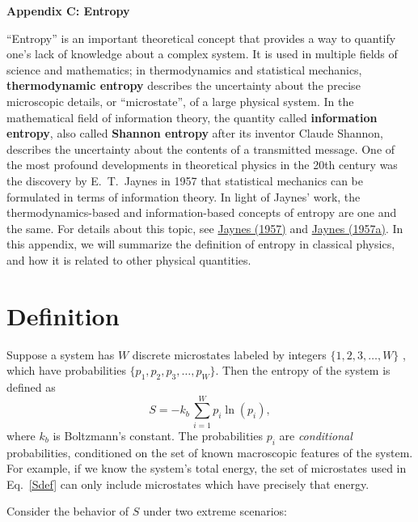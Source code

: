 \documentclass[pra,12pt]{revtex4}
\begin{document}
\begin{center}
{\large \textbf{Appendix C: Entropy}}
\end{center}

``Entropy'' is an important theoretical concept that provides a way to
quantify one's lack of knowledge about a complex system.  It is used
in multiple fields of science and mathematics; in thermodynamics and
statistical mechanics, \textbf{thermodynamic entropy} describes the
uncertainty about the precise microscopic details, or ``microstate'',
of a large physical system.  In the mathematical field of information
theory, the quantity called \textbf{information entropy}, also called
\textbf{Shannon entropy} after its inventor Claude Shannon, describes
the uncertainty about the contents of a transmitted message.  One of
the most profound developments in theoretical physics in the 20th
century was the discovery by E.~T.~Jaynes in 1957 that statistical
mechanics can be formulated in terms of information theory.  In light
of Jaynes' work, the thermodynamics-based and information-based
concepts of entropy are one and the same.  For details about this
topic, see \hyperref[cite:jaynes]{Jaynes (1957)} and
\hyperref[cite:jaynes2]{Jaynes (1957a)}.  In this appendix, we will
summarize the definition of entropy in classical physics, and how it
is related to other physical quantities.

\section{Definition}

Suppose a system has $W$ discrete microstates labeled by integers
$\{1,2,3,\dots, W\}$ , which have probabilities $\{p_1, p_2, p_3,
\dots, p_W\}$.  Then the entropy of the system is defined as
\begin{equation}
  S = - k_b \, \sum_{i=1}^W p_i \ln(p_i),
  \label{Sdef}
\end{equation}
where $k_b$ is Boltzmann's constant.  The probabilities $p_i$ are
\textit{conditional} probabilities, conditioned on the set of known
macroscopic features of the system.  For example, if we know the
system's total energy, the set of microstates used in Eq.~\eqref{Sdef}
can only include microstates which have precisely that energy.

Consider the behavior of $S$ under two extreme
scenarios:
\end{document}
